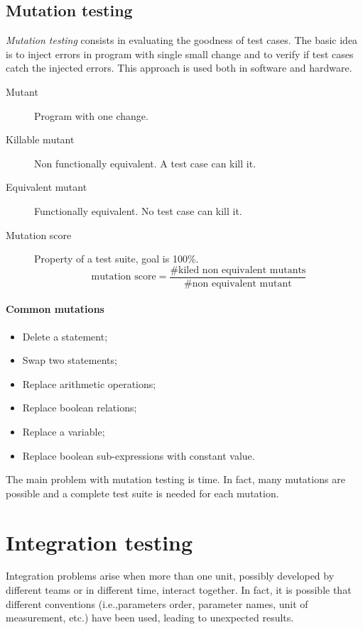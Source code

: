 \subsection{Mutation testing}
\emph{Mutation testing} consists in evaluating the goodness of test cases. The basic idea is to inject errors in program with single small change and to verify if test cases catch the injected errors. This approach is used both in software and hardware.

\begin{description}
\item [Mutant] Program with one change.
\item [Killable mutant] Non functionally equivalent. A test case can kill it.
\item [Equivalent mutant] Functionally equivalent. No test case can kill it.
\item [Mutation score] Property of a test suite, goal is 100\%.
\[
\text{mutation score} = \dfrac{\text{\# kiled non equivalent mutants}}{\text{\# non equivalent mutant}}
\]
\end{description}

\paragraph{Common mutations}
\begin{itemize}
\item Delete a statement;
\item Swap two statements;
\item Replace arithmetic operations;
\item Replace boolean relations;
\item Replace a variable;
\item Replace boolean sub-expressions with constant value.
\end{itemize}
The main problem with mutation testing is time. In fact, many mutations are possible and a complete test suite is needed for each mutation.

\section{Integration testing}
Integration problems arise when more than one unit, possibly developed by different teams or in different time, interact together. In fact, it is possible that different conventions (i.e.,\@ parameters order, parameter names, unit of measurement, etc.) have been used, leading to unexpected results.

